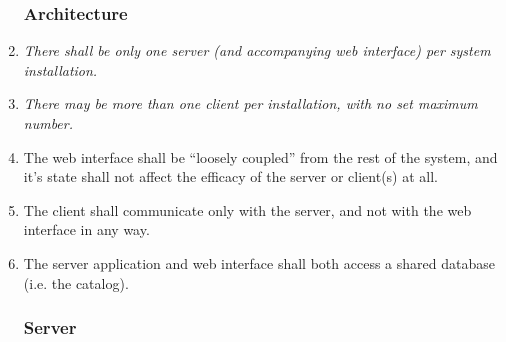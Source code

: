 \begin{enumerate}

\renewcommand{\theenumi}{\arabic{enumi}}
\renewcommand{\labelenumi}{\textsc{FuncReq}$\theenumi$.}

\subsubsection{Architecture}

    \item \emph{There shall be only one server (and accompanying web interface)
        per system installation.}
    \item \emph{There may be more than one client per installation, with no set
        maximum number.}
    \item The web interface shall be ``loosely coupled'' from the rest of the
        system, and it's state shall not affect the efficacy of the server or
        client(s) at all.
    \item The client shall communicate only with the server, and not with the
        web interface in any way.
    \item The server application and web interface shall both access a shared
        database (i.e. the catalog).

\subsubsection{Server}


\end{enumerate}
